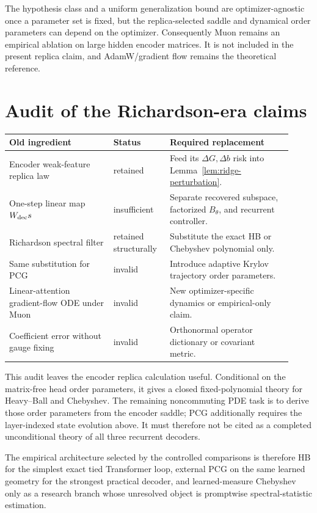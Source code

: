 \documentclass[11pt]{article}
\begin{document}
The hypothesis class and a uniform generalization bound are optimizer-agnostic
once a parameter set is fixed, but the replica-selected saddle and dynamical
order parameters can depend on the optimizer.  Consequently Muon remains an
empirical ablation on large hidden encoder matrices.  It is not included in
the present replica claim, and AdamW/gradient flow remains the theoretical
reference.

\section{Audit of the Richardson-era claims}

\begin{center}
\begin{tabular}{p{0.34\linewidth}p{0.18\linewidth}p{0.40\linewidth}}
\toprule
Old ingredient & Status & Required replacement\\
\midrule
Encoder weak-feature replica law & retained & Feed its $\Delta G,\Delta b$ risk into
Lemma~\ref{lem:ridge-perturbation}.\\
One-step linear map $W_{\rm dec}s$ & insufficient & Separate recovered subspace,
factorized $B_\theta$, and recurrent controller.\\
Richardson spectral filter & retained structurally & Substitute the exact HB or
Chebyshev polynomial only.\\
Same substitution for PCG & invalid & Introduce adaptive Krylov trajectory order
parameters.\\
Linear-attention gradient-flow ODE under Muon & invalid & New optimizer-specific
dynamics or empirical-only claim.\\
Coefficient error without gauge fixing & invalid & Orthonormal operator dictionary
or covariant metric.\\
\bottomrule
\end{tabular}
\end{center}

This audit leaves the encoder replica calculation useful.  Conditional on
the matrix-free head order parameters, it gives a closed fixed-polynomial
theory for Heavy--Ball and Chebyshev.  The remaining noncommuting PDE task is
to derive those order parameters from the encoder saddle; PCG additionally
requires the layer-indexed state evolution above.  It must therefore not be
cited as a completed unconditional theory of all three recurrent decoders.

The empirical architecture selected by the controlled comparisons is
therefore HB for the simplest exact tied Transformer loop, external PCG on
the same learned geometry for the strongest practical decoder, and
learned-measure Chebyshev only as a research branch whose unresolved object
is promptwise spectral-statistic estimation.
\end{document}

